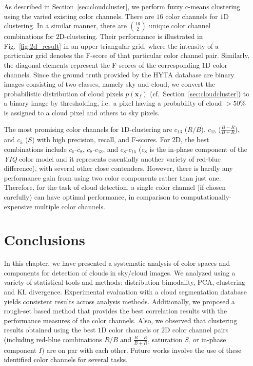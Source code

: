 As described in Section~\ref{sec:cloudcluster}, we perform fuzzy c-means clustering using the varied existing color channels. There are $16$ color channels for $1$D clustering.  In a similar manner, there are ${{16}\choose{2}}$ unique color channel combinations for $2$D-clustering. Their performance is illustrated in Fig.~\ref{fig:2d_result} in an upper-triangular grid, where the intensity of a particular grid denotes the F-score of that particular color channel pair. Similarly, the diagonal elements represent the F-scores of the corresponding $1$D color channels. Since the ground truth provided by the HYTA database are binary images consisting of two classes, namely sky and cloud, we convert the probabilistic distribution of cloud pixels $p(\textbf{x}_{f})$ (cf.\ Section~\ref{sec:cloudcluster}) to a binary image by thresholding, i.e.\ a pixel having a probability of cloud $>50\%$ is assigned to a cloud pixel and others to sky pixels.


The most promising color channels for $1$D-clustering are $c_{13}$ ($R/B$), $c_{15}$ ($\frac{B-R}{B+R}$), and $c_{5}$ ($S$) with high precision, recall, and F-scores.  For $2$D, the best combinations include $c_5$-$c_8$, $c_8$-$c_{13}$, and $c_8$-$c_{15}$ ($c_8$ is the in-phase component of the \emph{YIQ} color model and it represents essentially another variety of red-blue difference), with several other close contenders. However, there is hardly any performance gain from using two color components rather than just one. Therefore, for the task of cloud detection, a single color channel (if chosen carefully) can have optimal performance, in comparison to computationally-expensive multiple color channels. 

\section{Conclusions}
\label{sec:chap4-conclude}
In this chapter, we have presented a systematic analysis of color spaces and components for detection of clouds in sky/cloud images. We analyzed using a variety of statistical tools and methods: distribution bimodality, PCA, clustering and KL divergence.  Experimental evaluation with a cloud segmentation database yields consistent results across analysis methods. Additionally, we proposed a rough-set based method that provides the best correlation results with the performance measures of the color channels. Also, we observed that clustering results obtained using the best $1$D color channels or $2$D color channel pairs (including red-blue combinations $R/B$ and $\frac{B-R}{B+R}$, saturation $S$, or in-phase component $I$) are on par with each other. Future works involve the use of these identified color channels for several tasks. 













